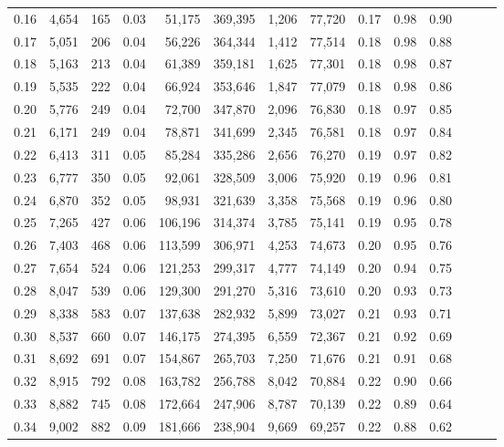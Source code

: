 \begin{tabular}{rrrrrrrrrrrrrr}
0.16 &  4,654 &    165 &  0.03 &   51,175 &  369,395 &   1,206 &  77,720 &  0.17 &  0.98 &      0.90 \\
0.17 &  5,051 &    206 &  0.04 &   56,226 &  364,344 &   1,412 &  77,514 &  0.18 &  0.98 &      0.88 \\
0.18 &  5,163 &    213 &  0.04 &   61,389 &  359,181 &   1,625 &  77,301 &  0.18 &  0.98 &      0.87 \\
0.19 &  5,535 &    222 &  0.04 &   66,924 &  353,646 &   1,847 &  77,079 &  0.18 &  0.98 &      0.86 \\
0.20 &  5,776 &    249 &  0.04 &   72,700 &  347,870 &   2,096 &  76,830 &  0.18 &  0.97 &      0.85 \\
0.21 &  6,171 &    249 &  0.04 &   78,871 &  341,699 &   2,345 &  76,581 &  0.18 &  0.97 &      0.84 \\
0.22 &  6,413 &    311 &  0.05 &   85,284 &  335,286 &   2,656 &  76,270 &  0.19 &  0.97 &      0.82 \\
0.23 &  6,777 &    350 &  0.05 &   92,061 &  328,509 &   3,006 &  75,920 &  0.19 &  0.96 &      0.81 \\
0.24 &  6,870 &    352 &  0.05 &   98,931 &  321,639 &   3,358 &  75,568 &  0.19 &  0.96 &      0.80 \\
0.25 &  7,265 &    427 &  0.06 &  106,196 &  314,374 &   3,785 &  75,141 &  0.19 &  0.95 &      0.78 \\
0.26 &  7,403 &    468 &  0.06 &  113,599 &  306,971 &   4,253 &  74,673 &  0.20 &  0.95 &      0.76 \\
0.27 &  7,654 &    524 &  0.06 &  121,253 &  299,317 &   4,777 &  74,149 &  0.20 &  0.94 &      0.75 \\
0.28 &  8,047 &    539 &  0.06 &  129,300 &  291,270 &   5,316 &  73,610 &  0.20 &  0.93 &      0.73 \\
0.29 &  8,338 &    583 &  0.07 &  137,638 &  282,932 &   5,899 &  73,027 &  0.21 &  0.93 &      0.71 \\
0.30 &  8,537 &    660 &  0.07 &  146,175 &  274,395 &   6,559 &  72,367 &  0.21 &  0.92 &      0.69 \\
0.31 &  8,692 &    691 &  0.07 &  154,867 &  265,703 &   7,250 &  71,676 &  0.21 &  0.91 &      0.68 \\
0.32 &  8,915 &    792 &  0.08 &  163,782 &  256,788 &   8,042 &  70,884 &  0.22 &  0.90 &      0.66 \\
0.33 &  8,882 &    745 &  0.08 &  172,664 &  247,906 &   8,787 &  70,139 &  0.22 &  0.89 &      0.64 \\
0.34 &  9,002 &    882 &  0.09 &  181,666 &  238,904 &   9,669 &  69,257 &  0.22 &  0.88 &      0.62 \\

\end{tabular}
